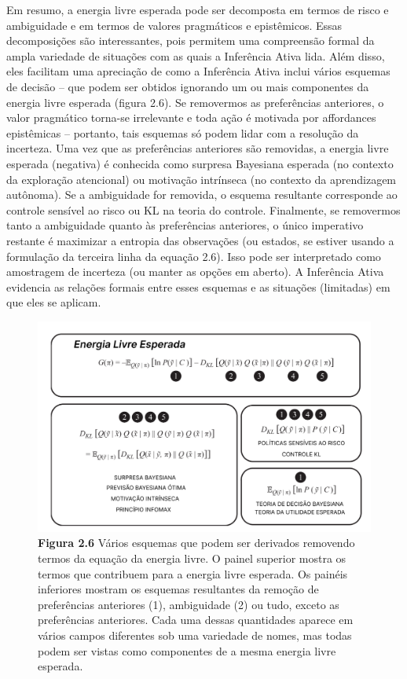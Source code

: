 \documentclass[
  12pt,
]{book}
\begin{document}
Em resumo, a energia livre esperada pode ser decomposta em termos de risco e ambiguidade e em termos de valores pragmáticos e epistêmicos. Essas decomposições são interessantes, pois permitem uma compreensão formal da ampla variedade de situações com as quais a Inferência Ativa lida. Além disso, eles facilitam uma apreciação de como a Inferência Ativa inclui vários esquemas de decisão -- que podem ser obtidos ignorando um ou mais componentes da energia livre esperada (figura 2.6). Se removermos as preferências anteriores, o valor pragmático torna-se irrelevante e toda ação é motivada por affordances epistêmicas -- portanto, tais esquemas só podem lidar com a resolução da incerteza. Uma vez que as preferências anteriores são removidas, a energia livre esperada (negativa) é conhecida como surpresa Bayesiana esperada (no contexto da exploração atencional) ou motivação intrínseca (no contexto da aprendizagem autônoma). Se a ambiguidade for removida, o esquema resultante corresponde ao controle sensível ao risco ou KL na teoria do controle. Finalmente, se removermos tanto a ambiguidade quanto às preferências anteriores, o único imperativo restante é maximizar a entropia das observações (ou estados, se estiver usando a formulação da terceira linha da equação 2.6). Isso pode ser interpretado como amostragem de incerteza (ou manter as opções em aberto). A Inferência Ativa evidencia as relações formais entre esses esquemas e as situações (limitadas) em que eles se aplicam.

\begin{figure}
\centering
\includegraphics{images/Figura_2_6.png}
\caption{\textbf{Figura 2.6} Vários esquemas que podem ser derivados removendo termos da equação da energia livre. O painel superior mostra os termos que contribuem para a energia livre esperada. Os painéis inferiores mostram os esquemas resultantes da remoção de preferências anteriores (1), ambiguidade (2) ou tudo, exceto as preferências anteriores. Cada uma dessas quantidades aparece em vários campos diferentes sob uma variedade de nomes, mas todas podem ser vistas como componentes de a mesma energia livre esperada.}
\end{figure}
\end{document}
